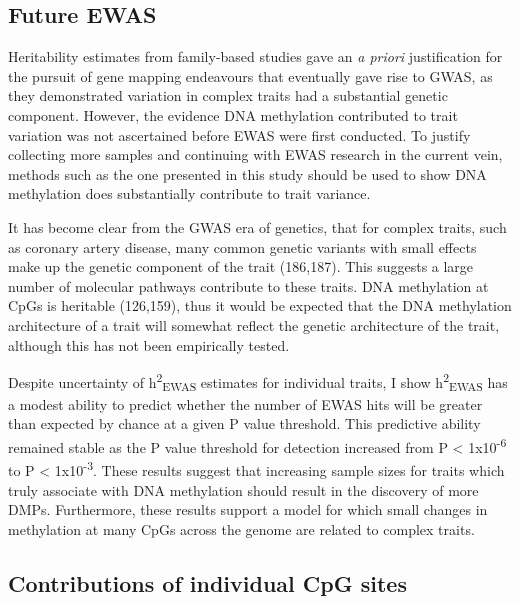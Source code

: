 \documentclass[11pt,oneside]{bristolthesis}
\begin{document}
\hypertarget{future-ewas-05}{%
\subsection{Future EWAS}\label{future-ewas-05}}

Heritability estimates from family-based studies gave an \emph{a priori} justification for the pursuit of gene mapping endeavours that eventually gave rise to GWAS, as they demonstrated variation in complex traits had a substantial genetic component. However, the evidence DNA methylation contributed to trait variation was not ascertained before EWAS were first conducted. To justify collecting more samples and continuing with EWAS research in the current vein, methods such as the one presented in this study should be used to show DNA methylation does substantially contribute to trait variance.

It has become clear from the GWAS era of genetics, that for complex traits, such as coronary artery disease, many common genetic variants with small effects make up the genetic component of the trait (186,187). This suggests a large number of molecular pathways contribute to these traits. DNA methylation at CpGs is heritable (126,159), thus it would be expected that the DNA methylation architecture of a trait will somewhat reflect the genetic architecture of the trait, although this has not been empirically tested.

Despite uncertainty of h\textsuperscript{2}\textsubscript{EWAS} estimates for individual traits, I show h\textsuperscript{2}\textsubscript{EWAS} has a modest ability to predict whether the number of EWAS hits will be greater than expected by chance at a given P value threshold. This predictive ability remained stable as the P value threshold for detection increased from P \textless{} 1x10\textsuperscript{-6} to P \textless{} 1x10\textsuperscript{-3}. These results suggest that increasing sample sizes for traits which truly associate with DNA methylation should result in the discovery of more DMPs. Furthermore, these results support a model for which small changes in methylation at many CpGs across the genome are related to complex traits.

\hypertarget{contribution-of-individual-cpg-sites}{%
\subsection{Contributions of individual CpG sites}\label{contribution-of-individual-cpg-sites}}
\end{document}
